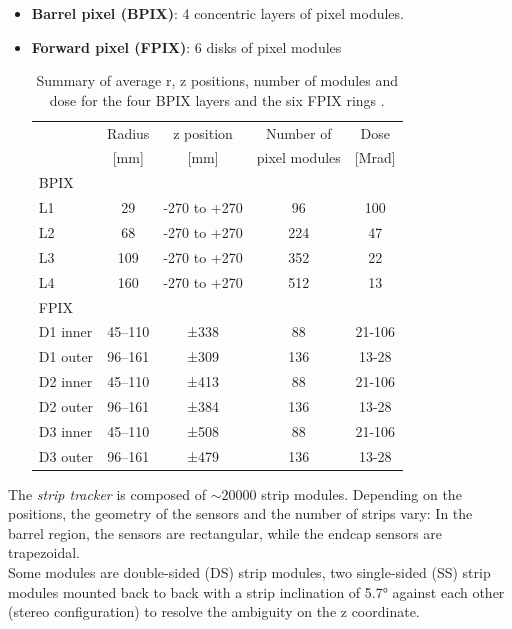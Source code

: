 \begin{itemize}
    \item \textbf{Barrel pixel (BPIX)}: 4 concentric layers of pixel modules.
    \item \textbf{Forward pixel (FPIX)}: 6 disks of pixel modules
    \begin{table}[h!]
        \centering
        \begin{tabular}{l|c|c|c|c}
            & Radius & z position & Number of & Dose \\
            & [mm]   &  [mm]    &  pixel modules & [Mrad]\\
            \hline
            BPIX & \multicolumn{4}{c}{ } \\
            \hline
            L1&29&-270 to +270&96& 100 \\
            L2&68&-270 to +270&224& 47\\
            L3&109&-270 to +270&352& 22\\
            L4&160&-270 to +270&512& 13 \\
            \hline
            FPIX & \multicolumn{4}{c}{ } \\
            \hline
            D1 inner&45–110&±338&88 & 21-106\\
            D1 outer&96–161&±309&136 & 13-28\\
            D2 inner&45–110&±413&88 & 21-106\\
            D2 outer&96–161&±384&136 & 13-28\\
            D3 inner&45–110&±508&88 & 21-106\\
            D3 outer&96–161&±479&136 & 13-28\\
        \end{tabular}
        \caption{Summary of average r, z positions, number of modules and dose for the four BPIX layers and
the six FPIX rings \cite{Adam2021TheUpgrade}.}
        \label{tab:pixel_tracker}
    \end{table}
\end{itemize}
The \emph{strip tracker} \cite{Friedl2001TheReadout} is composed of  $\sim 20000$ strip modules. Depending on the positions, the geometry of the sensors and the number of strips vary: In the barrel region, the sensors are rectangular, while the endcap sensors are trapezoidal.\\
Some modules are double-sided (DS) strip modules, \ie two single-sided (SS) strip modules mounted back to back with a strip inclination of 5.7° against each other (stereo configuration) to resolve the ambiguity on the z coordinate.


